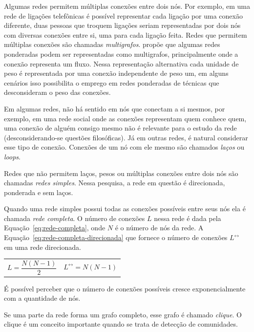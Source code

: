\documentclass[12pt,a4paper]{article}
\theoremstyle{hypo}
\newcommand{\linkboth}[1]{#1^\leftrightarrow} %
\begin{document}
Algumas redes permitem múltiplas conexões entre dois nós. Por exemplo, em uma rede de ligações telefônicas é possível representar cada ligação por uma conexão diferente, duas pessoas que troquem ligações seriam representadas por dois nós com diversas conexões entre si, uma para cada ligação feita. Redes que permitem múltiplas conexões são chamadas \textit{multigrafos}.  propõe que algumas redes ponderadas podem ser representadas como multigrafos, principalmente onde a conexão representa um fluxo. Nessa representação alternativa cada unidade de peso é representada por uma conexão independente de peso um, em alguns cenários isso possibilita o emprego em redes ponderadas de técnicas que desconsideram o peso das conexões.

Em algumas redes, não há sentido em nós que conectam a si mesmos, por exemplo, em uma rede social onde as conexões representam quem conhece quem, uma conexão de alguém consigo mesmo não é relevante para o estudo da rede (desconsiderando-se questões filosóficas). Já em outras redes, é natural considerar esse tipo de conexão. Conexões de um nó com ele mesmo são chamados \textit{laços} ou \textit{loops}.

Redes que não permitem laços, pesos ou múltiplas conexões entre dois nós são chamadas \textit{redes simples}. Nessa pesquisa, a rede em questão é direcionada, ponderada e sem laços.

Quando uma rede simples possui todas as conexões possíveis entre seus nós ela é chamada \textit{rede completa}. O número de conexões $L$ nessa rede é dada pela Equação~\ref{eq:rede-completa}, onde $N$ é o número de nós da rede. A Equação~\ref{eq:rede-completa-direcionada} que fornece o número de conexões $\linkboth{L}$ em uma rede direcionada.

\noindent
\begin{tabularx}{\linewidth}{@{}XX@{}}
    \begin{equation} \label{eq:rede-completa}
       L = \frac{N(N - 1)}{2}
    \end{equation} &
    \begin{equation} \label{eq:rede-completa-direcionada}
        \linkboth{L} = N(N - 1)
    \end{equation}
\end{tabularx}

É possível perceber que o número de conexões possíveis cresce exponencialmente com a quantidade de nós.

Se uma parte da rede forma um grafo completo, esse grafo é chamado \textit{clique}. O clique é um conceito importante quando se trata de detecção de comunidades.
\end{document}

